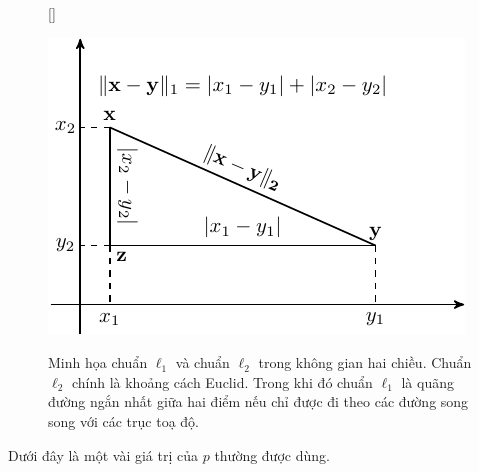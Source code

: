 \begin{figure}[t]
[\FBwidth]
{%
\caption{Minh họa chuẩn $\ell_1$ và chuẩn $\ell_2$ trong không gian hai chiều.
Chuẩn $\ell_2$ chính
là khoảng cách Euclid. Trong khi đó chuẩn $\ell_1$ là quãng
đường ngắn nhất giữa hai điểm nếu chỉ được đi theo các đường song song với
các trục toạ độ.}
\label{fig:norm12}}
{ %
\includegraphics[width=.5\textwidth]{Chapters/02_LinearAlgebra/linearalgebra/norm12.pdf}
}
\end{figure}
Dưới đây là một vài giá trị của $p$ thường được dùng.
